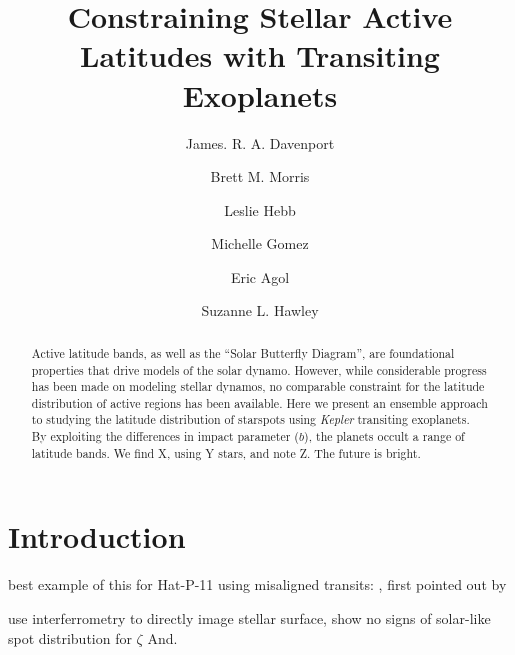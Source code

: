 \documentclass[preprint2]{aastex61}
\newcommand{\Kepler}{\textsl{Kepler}\xspace}
\begin{document}
\title{Constraining Stellar Active Latitudes with Transiting Exoplanets}



\author{James. R. A. Davenport}

\author{Brett M. Morris}

\author{Leslie Hebb}

\author{Michelle Gomez}

\author{Eric Agol}

\author{Suzanne L. Hawley}



\begin{abstract}
Active latitude bands, as well as the ``Solar Butterfly Diagram'', are foundational properties that drive models of the solar dynamo. However, while considerable progress has been made on modeling stellar dynamos, no comparable constraint for the latitude distribution of active regions has been available. Here we present an ensemble approach to studying the latitude distribution of starspots using \Kepler transiting exoplanets. By exploiting the differences in impact parameter ($b$), the planets occult a range of latitude bands. We find X, using Y stars, and note Z. The future is bright.
\end{abstract}



\section{Introduction}
\label{sec:intro}

best example of this for Hat-P-11 using misaligned transits:
\cite{morris2017}, first pointed out by \cite{sanchis-ojeda2011}

\cite{roettenbacher2016} use interferrometry to directly image stellar surface, show no signs of solar-like spot distribution for $\zeta$ And.
\end{document}
